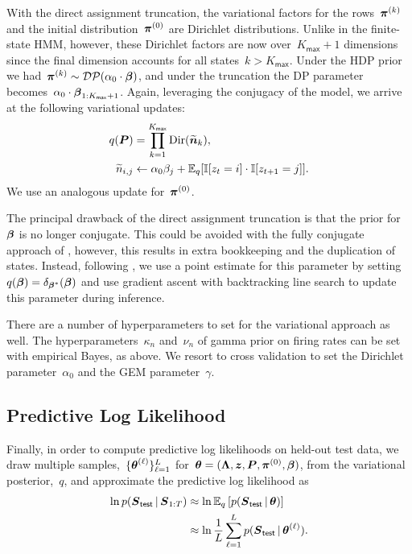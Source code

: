 With the direct assignment truncation, the variational factors for the
rows~$\boldsymbol{\pi}^{(k)}$ and the initial distribution~$\boldsymbol{\pi}^{(0)}$ are
Dirichlet distributions. Unlike in the finite-state HMM, however,
these Dirichlet factors are now over~${K_{\mathsf{max}}+1}$ dimensions since the final
dimension accounts for all states~${k>K_{\mathsf{max}}}$. Under the HDP prior we
had~${\boldsymbol{\pi}^{(k)} \sim \mathcal{DP}(\alpha_0 \cdot \boldsymbol{\beta})}$, and under the
truncation the DP parameter becomes~$\alpha_0 \cdot
\boldsymbol{\beta}_{1:K_{\mathsf{max}}+1}$.
Again, leveraging the conjugacy of the model, we arrive at the
following variational updates:
\begin{align*}
q(\boldsymbol{P}) &= \prod_{k=1}^{K_{\mathsf{max}}} \mathrm{Dir}(\widetilde{\boldsymbol{n}}_k), \\
\widetilde{n}_{i,j} &\leftarrow \alpha_0 \beta_j + \mathbb{E}_q[\mathbb{I}[z_t=i]\cdot\mathbb{I}[z_{t+1}=j]].
\end{align*}
We use an analogous update for~$\boldsymbol{\pi}^{(0)}$.

The principal drawback of the direct assignment truncation is that the
prior for~$\boldsymbol{\beta}$ is no longer conjugate. This could be avoided with
the fully conjugate approach of \citep{Hoffman13}, however, this
results in extra bookkeeping and the duplication of states. Instead,
following \citep{Johnson14, Bryant12, Liang07}, we use a point
estimate for this parameter by setting~${q(\boldsymbol{\beta})=\delta_{\boldsymbol{\beta}^*}}(\boldsymbol{\beta})$
and use gradient ascent with backtracking line search to update this
parameter during inference.

There are a number of hyperparameters to set for the variational
approach as well. The hyperparameters~$\kappa_n$ and~$\nu_n$ of
gamma prior on firing rates can be set with empirical Bayes, as
above. We resort to cross validation to set the Dirichlet
parameter~$\alpha_0$ and the GEM parameter~$\gamma$.
 

\subsection{Predictive Log Likelihood}
Finally, in order to compute predictive log likelihoods on held-out
test data, we draw multiple samples,~$\{\boldsymbol{\theta}^{(\ell)}\}_{\ell=1}^L$
for~$\boldsymbol{\theta}=(\boldsymbol{\Lambda}, \boldsymbol{z}, \boldsymbol{P}, \boldsymbol{\pi}^{(0)}, \boldsymbol{\beta})$, from the
variational posterior,~$q$, and approximate the predictive log likelihood as
\begin{align*}
  \ln p(\boldsymbol{S}_{\mathsf{test}} \,|\, \boldsymbol{S}_{1:T}) 
  &\approx \ln \mathbb{E}_q\left[p(\boldsymbol{S}_{\mathsf{test}} \,|\, \boldsymbol{\theta})\right] \\
  &\approx \ln \frac{1}{L} \sum_{\ell=1}^L p(\boldsymbol{S}_{\mathsf{test}} \,|\, \boldsymbol{\theta}^{(\ell)}).
\end{align*}

